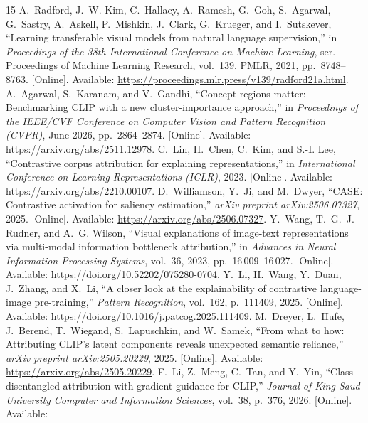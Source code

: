 \begin{thebibliography}{15}
A.~Radford, J.~W. Kim, C.~Hallacy, A.~Ramesh, G.~Goh, S.~Agarwal, G.~Sastry,
A.~Askell, P.~Mishkin, J.~Clark, G.~Krueger, and I.~Sutskever, ``Learning
transferable visual models from natural language supervision,'' in
\emph{Proceedings of the 38th International Conference on Machine Learning},
ser. Proceedings of Machine Learning Research, vol.~139. PMLR, 2021,
pp.~8748--8763. [Online]. Available:
\url{https://proceedings.mlr.press/v139/radford21a.html}.
A.~Agarwal, S.~Karanam, and V.~Gandhi, ``Concept regions matter: Benchmarking
{CLIP} with a new cluster-importance approach,'' in \emph{Proceedings of the
IEEE/CVF Conference on Computer Vision and Pattern Recognition (CVPR)}, June
2026, pp.~2864--2874. [Online]. Available:
\url{https://arxiv.org/abs/2511.12978}.
C.~Lin, H.~Chen, C.~Kim, and S.-I. Lee, ``Contrastive corpus attribution for
explaining representations,'' in \emph{International Conference on Learning
Representations (ICLR)}, 2023. [Online]. Available:
\url{https://arxiv.org/abs/2210.00107}.
D.~Williamson, Y.~Ji, and M.~Dwyer, ``{CASE}: Contrastive activation for saliency
estimation,'' \emph{arXiv preprint arXiv:2506.07327}, 2025. [Online]. Available:
\url{https://arxiv.org/abs/2506.07327}.
Y.~Wang, T.~G.~J. Rudner, and A.~G. Wilson, ``Visual explanations of image-text
representations via multi-modal information bottleneck attribution,'' in
\emph{Advances in Neural Information Processing Systems}, vol.~36, 2023,
pp.~16\,009--16\,027. [Online]. Available:
\url{https://doi.org/10.52202/075280-0704}.
Y.~Li, H.~Wang, Y.~Duan, J.~Zhang, and X.~Li, ``A closer look at the explainability
of contrastive language-image pre-training,'' \emph{Pattern Recognition},
vol.~162, p.~111409, 2025. [Online]. Available:
\url{https://doi.org/10.1016/j.patcog.2025.111409}.
M.~Dreyer, L.~Hufe, J.~Berend, T.~Wiegand, S.~Lapuschkin, and W.~Samek, ``From
what to how: Attributing {CLIP}'s latent components reveals unexpected semantic
reliance,'' \emph{arXiv preprint arXiv:2505.20229}, 2025. [Online]. Available:
\url{https://arxiv.org/abs/2505.20229}.
F.~Li, Z.~Meng, C.~Tan, and Y.~Yin, ``Class-disentangled attribution with gradient
guidance for {CLIP},'' \emph{Journal of King Saud University Computer and
Information Sciences}, vol.~38, p.~376, 2026. [Online]. Available:

\end{thebibliography}
